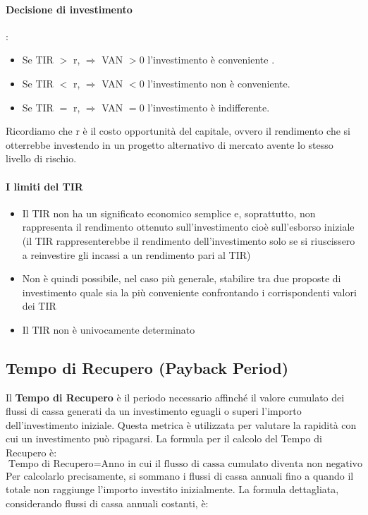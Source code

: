 \documentclass{article}
\begin{document}
\paragraph{Decisione di investimento} :
\begin{itemize}
    \item Se TIR $>$ r, $\Rightarrow$ VAN $>0$ l'investimento è conveniente .
    \item Se TIR $<$ r, $\Rightarrow$ VAN $<0$ l'investimento non è conveniente.
    \item Se TIR $=$ r, $\Rightarrow$ VAN $=0$ l'investimento è indifferente.
\end{itemize}
Ricordiamo che r è il costo opportunità del capitale, ovvero il rendimento che si otterrebbe investendo in un progetto alternativo di mercato avente lo stesso livello di rischio.
\paragraph{I limiti del TIR}
\begin{itemize}
    \item Il TIR non ha un significato economico semplice e, soprattutto, non rappresenta il rendimento ottenuto sull’investimento cioè sull’esborso iniziale
          (il TIR rappresenterebbe il rendimento dell’investimento solo se si riuscissero a reinvestire gli incassi a un rendimento pari al TIR)
    \item Non è quindi possibile, nel caso più generale, stabilire tra due proposte di investimento quale sia la più conveniente confrontando i corrispondenti valori dei TIR
    \item Il TIR non è univocamente determinato
\end{itemize}
\newpage
\subsection*{Tempo di Recupero (Payback Period)}
Il \textbf{Tempo di Recupero} è il periodo necessario affinché il valore cumulato dei flussi di cassa generati da un investimento eguagli o superi l'importo dell'investimento iniziale. Questa metrica è utilizzata per valutare la rapidità con cui un investimento può ripagarsi. La formula per il calcolo del Tempo di Recupero è:
\[
    \text{Tempo di Recupero} = \text{Anno in cui il flusso di cassa cumulato diventa non negativo}
\]
Per calcolarlo precisamente, si sommano i flussi di cassa annuali fino a quando il totale non raggiunge l'importo investito inizialmente. La formula dettagliata, considerando flussi di cassa annuali costanti, è:
\end{document}
